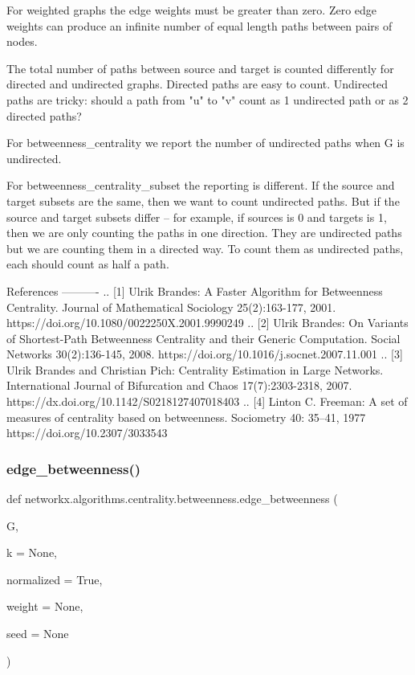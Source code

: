 \begin{DoxyVerb}
For weighted graphs the edge weights must be greater than zero.
Zero edge weights can produce an infinite number of equal length
paths between pairs of nodes.

The total number of paths between source and target is counted
differently for directed and undirected graphs. Directed paths
are easy to count. Undirected paths are tricky: should a path
from "u" to "v" count as 1 undirected path or as 2 directed paths?

For betweenness_centrality we report the number of undirected
paths when G is undirected.

For betweenness_centrality_subset the reporting is different.
If the source and target subsets are the same, then we want
to count undirected paths. But if the source and target subsets
differ -- for example, if sources is {0} and targets is {1},
then we are only counting the paths in one direction. They are
undirected paths but we are counting them in a directed way.
To count them as undirected paths, each should count as half a path.

References
----------
.. [1] Ulrik Brandes:
   A Faster Algorithm for Betweenness Centrality.
   Journal of Mathematical Sociology 25(2):163-177, 2001.
   https://doi.org/10.1080/0022250X.2001.9990249
.. [2] Ulrik Brandes:
   On Variants of Shortest-Path Betweenness
   Centrality and their Generic Computation.
   Social Networks 30(2):136-145, 2008.
   https://doi.org/10.1016/j.socnet.2007.11.001
.. [3] Ulrik Brandes and Christian Pich:
   Centrality Estimation in Large Networks.
   International Journal of Bifurcation and Chaos 17(7):2303-2318, 2007.
   https://dx.doi.org/10.1142/S0218127407018403
.. [4] Linton C. Freeman:
   A set of measures of centrality based on betweenness.
   Sociometry 40: 35–41, 1977
   https://doi.org/10.2307/3033543
\end{DoxyVerb}
 \mbox{\label{namespacenetworkx_1_1algorithms_1_1centrality_1_1betweenness_a222bc9e52fd1921c2544d84592337ab6}} 
\subsubsection{\texorpdfstring{edge\+\_\+betweenness()}{edge\_betweenness()}}
{\footnotesize\ttfamily def networkx.\+algorithms.\+centrality.\+betweenness.\+edge\+\_\+betweenness (\begin{DoxyParamCaption}\item[{}]{G,  }\item[{}]{k = {\ttfamily None},  }\item[{}]{normalized = {\ttfamily True},  }\item[{}]{weight = {\ttfamily None},  }\item[{}]{seed = {\ttfamily None} }\end{DoxyParamCaption})}

